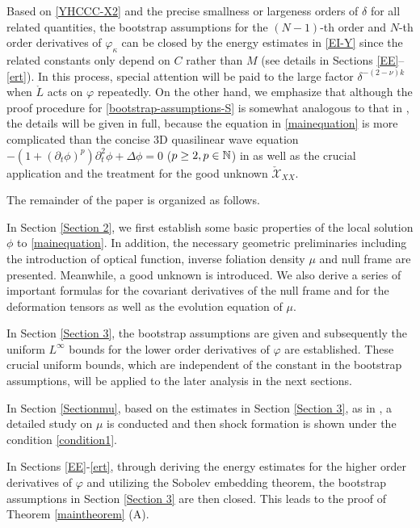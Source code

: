 \documentclass[11pt,twoside]{article}
\def\vp{\varphi}
\def\p{\partial}
\begin{document}
Based on \eqref{YHCCC-X2} and the precise  smallness or largeness orders of
$\delta$ for all related quantities,
the bootstrap assumptions for the $(N-1)$-th order and $N$-th order derivatives of $\varphi_\kappa$ can be closed by the energy estimates
in \eqref{EI-Y} since the related constants only depend on $C$ rather than $M$ (see details in Sections \ref{EE}--\ref{ert}).
In this process, special attention will be paid to the large factor $\delta^{-(2-\nu)k}$  when $\mathring{L}$ acts on $\vp$ repeatedly.
On the other hand, we emphasize that although the proof procedure for \eqref{bootstrap-assumptions-S} is somewhat analogous to that
in \cite{L-Y, M-Y}, the details will be given in full, because the equation in \eqref{mainequation} is more complicated
than the concise 3D quasilinear wave equation $-(1+(\p_t\phi)^p)\p_t^2\phi+\Delta\phi=0$
($p\ge 2, p\in\Bbb N$) in \cite{L-Y, M-Y} as well as the crucial application and the treatment for the good unknown
$\check{\mathscr{X}}_{XX}$.

\medskip

The remainder of the paper is organized as follows.

In Section \ref{Section 2}, we first establish some basic properties of the local solution $\phi$ to \eqref{mainequation}.
In addition, the necessary geometric preliminaries including the introduction of optical function, inverse foliation density $\mu$
and null frame are presented. Meanwhile, a good unknown is introduced.
We also derive a series of important formulas for the covariant derivatives of the null frame and
for the deformation tensors as well as the evolution equation of $\mu$.

In Section \ref{Section 3}, the bootstrap assumptions are given and subsequently the uniform $L^\infty$ bounds for the
lower order derivatives of $\vp$ are established.
These crucial uniform bounds, which are independent of the constant in the bootstrap assumptions,
will be applied to the later analysis in the next sections.

In Section \ref{Sectionmu}, based on the estimates in Section \ref{Section 3},
as in  \cite{Ch1, Sp}, a detailed study on $\mu$ is conducted and then shock formation is shown under
the condition \eqref{condition1}.

In Sections \ref{EE}-\ref{ert}, through deriving the  energy estimates for the higher order derivatives
of $\vp$ and utilizing the Sobolev embedding theorem, the bootstrap assumptions in Section \ref{Section 3} are then closed.
This leads to the proof of Theorem \ref{maintheorem} (A).
\end{document}
